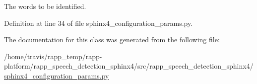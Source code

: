 The words to be identified. 



Definition at line 34 of file sphinx4\-\_\-configuration\-\_\-params.\-py.



The documentation for this class was generated from the following file\-:\begin{DoxyCompactItemize}
\item 
/home/travis/rapp\-\_\-temp/rapp-\/platform/rapp\-\_\-speech\-\_\-detection\-\_\-sphinx4/src/rapp\-\_\-speech\-\_\-detection\-\_\-sphinx4/\hyperlink{sphinx4__configuration__params_8py}{sphinx4\-\_\-configuration\-\_\-params.\-py}\end{DoxyCompactItemize}
